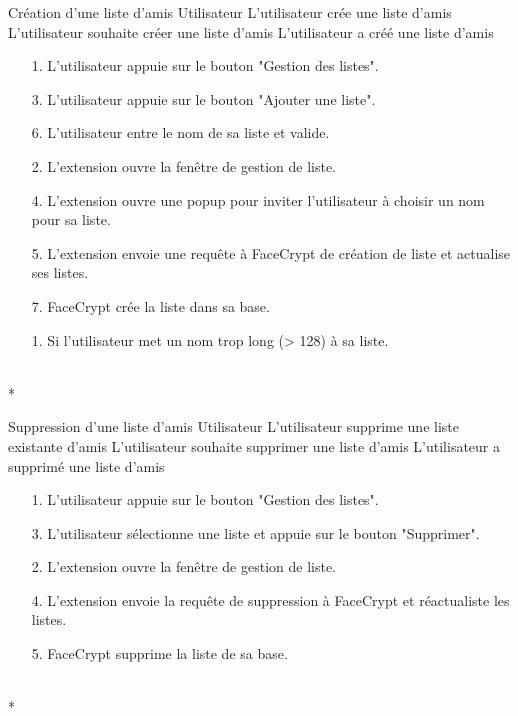 \documentclass[a4paper,11pt,french]{article}
\begin{document}
\fiche
	{Création d'une liste d'amis}
	{Utilisateur}
    {L'utilisateur crée une liste d'amis}
    {}
    {L'utilisateur souhaite créer une liste d'amis}
	{L'utilisateur a créé une liste d'amis}
    {\begin{itemize}
        \item[]        
        \item[1.] L'utilisateur appuie sur le bouton "Gestion des listes".
        \item[3.] L'utilisateur appuie sur le bouton "Ajouter une liste".
        \item[6.] L'utilisateur entre le nom de sa liste et valide.
    \end{itemize}}
	{\begin{itemize}
        \item[]		
        \item[2.] L'extension ouvre la fenêtre de gestion de liste.
	\item[4.] L'extension ouvre une popup pour inviter l'utilisateur
    		à choisir un nom pour sa liste.
	\item[5.] L'extension envoie une requête à FaceCrypt de création de 
		liste et actualise ses listes.
	\item[7.] FaceCrypt crée la liste dans sa base.
	\end{itemize}
	}
	{}
\flots
    {\begin{itemize}
    \item[]
    \item[1.] Si l'utilisateur met un nom trop long (> 128) à sa liste.
    \end{itemize}
    }
    {}
\\*

\fiche
	{Suppression d'une liste d'amis}
	{Utilisateur}
    {L'utilisateur supprime une liste existante d'amis}
    {}
    {L'utilisateur souhaite supprimer une liste d'amis}
	{L'utilisateur a supprimé une liste d'amis}
    {\begin{itemize}
        \item[]
        \item[1.] L'utilisateur appuie sur le bouton "Gestion des listes".
        \item[3.] L'utilisateur sélectionne une liste et appuie sur le bouton
        "Supprimer".
    \end{itemize}}
	{\begin{itemize}
        \item[]
		\item[2.] L'extension ouvre la fenêtre de gestion de liste.
		\item[4.] L'extension envoie la requête de suppression à FaceCrypt
		et réactualiste les listes.
		\item[5.] FaceCrypt supprime la liste de sa base.
	\end{itemize}
	}
	{}
\flots
    {}
    {}
\\*
\end{document}
